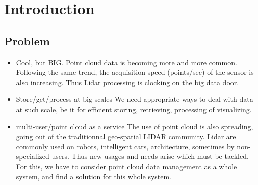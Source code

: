 

\section{Introduction}
	\subsection{Problem} 
		
		
		\begin{itemize}
			\item Cool, but BIG.
				Point cloud data is becoming more and more common. Following the same trend, the acquisition speed (points/sec) of the sensor is also increasing.
				Thus Lidar processing is clocking on the big data door.
			\item Store/get/process at big scales
				We need appropriate ways to deal with data at such scale,
				be it for efficient storing, retrieving, processing of visualizing.
			\item multi-user/point cloud as a service
				The use of point cloud is also spreading, going out of the traditionnal geo-spatial LIDAR community. Lidar are commonly used on robots, intelligent cars, architecture, sometimes by non-specialized users.
				Thus new usages and needs arise which must be tackled.
				For this, we have to consider point cloud data management as a whole system, and find a solution for this whole system.
		\end{itemize}  

